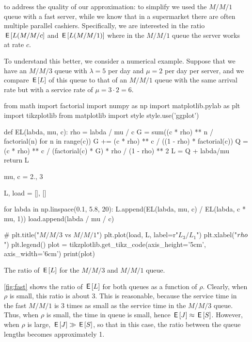  to address the quality of our approximation: to simplify we used the $M/M/1$ queue with a fast server, while we know that in a supermarket there are often multiple parallel cashiers. Specifically, we are interested in the ratio $\,\mathsf{E}\left[L(M/M/c\right]$ and $\,\mathsf{E}\left[L(M/M/1)\right]$ where in the $M/M/1$ queue the server works at rate $c$.

To understand this better, we consider a numerical example.
Suppose that we have an $M/M/3$ queue with $\lambda = 5$ per day and $\mu=2$ per day per server, and we compare $\,\mathsf{E}\left[L\right]$ of this queue to that of an $M/M/1$ queue with the same arrival rate but with a service rate of $\mu = 3\cdot 2 = 6$.
\begin{marginfigure}
\begin{pycode}[ratio]
from math import factorial
import numpy as np
import matplotlib.pylab as plt
import tikzplotlib
from matplotlib import style
style.use('ggplot')


def EL(labda, mu, c):
    rho = labda / mu / c
    G = sum((c * rho) ** n / factorial(n) for n in range(c))
    G += (c * rho) ** c / ((1 - rho) * factorial(c))
    Q = (c * rho) ** c / (factorial(c) * G) * rho / (1 - rho) ** 2
    L = Q + labda/mu
    return L


mu, c = 2., 3

L, load = [], []

for labda in np.linspace(0.1, 5.8, 20):
    L.append(EL(labda, mu, c) / EL(labda, c * mu, 1))
    load.append(labda / mu / c)

# plt.title("$M/M/3$ vs $M/M/1$")
plt.plot(load, L, label=r"$L_3/L_1$")
plt.xlabel("$\\rho$")
plt.legend()
plot = tikzplotlib.get_tikz_code(axis_height='5cm',
                                 axis_width='6cm')
print(plot)
\end{pycode}
\caption{The ratio of $\,\mathsf{E}\left[L\right]$ for the $M/M/3$ and $M/M/1$ queue.}
\label{fig:fast}
\end{marginfigure}

\cref{fig:fast} shows  the ratio of $\,\mathsf{E}\left[L\right]$ for both queues as a function of $\rho$.
Clearly, when $\rho$ is small, this ratio is about $3$.
This is reasonable, because the service time in the fast $M/M/1$ is 3 times as small as the service time in the $M/M/3$ queue.  Thus, when $\rho$ is small, the time in queue is small, hence $\,\mathsf{E}\left[J\right] \approx \,\mathsf{E}\left[S\right]$.
However, when $\rho$ is large, $\,\mathsf{E}\left[J\right] \gg \,\mathsf{E}\left[S\right]$, so that in this case, the ratio between the queue lengths becomes approximately 1.

